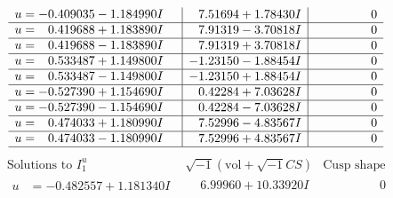 \documentclass[1p]{elsarticle_modified}
\theoremstyle{definition}
\newcommand{\I}{\sqrt{-1}}
\begin{document}
$$\begin{array}{c|c|c}
\begin{aligned}
u &= -0.409035 - 1.184990 I\end{aligned}
 & \phantom{-}7.51694 + 1.78430 I & \phantom{-0.000000 } 0 \\ \hline\begin{aligned}
u &= \phantom{-}0.419688 + 1.183890 I\end{aligned}
 & \phantom{-}7.91319 - 3.70818 I & \phantom{-0.000000 } 0 \\ \hline\begin{aligned}
u &= \phantom{-}0.419688 - 1.183890 I\end{aligned}
 & \phantom{-}7.91319 + 3.70818 I & \phantom{-0.000000 } 0 \\ \hline\begin{aligned}
u &= \phantom{-}0.533487 + 1.149800 I\end{aligned}
 & -1.23150 - 1.88454 I & \phantom{-0.000000 } 0 \\ \hline\begin{aligned}
u &= \phantom{-}0.533487 - 1.149800 I\end{aligned}
 & -1.23150 + 1.88454 I & \phantom{-0.000000 } 0 \\ \hline\begin{aligned}
u &= -0.527390 + 1.154690 I\end{aligned}
 & \phantom{-}0.42284 + 7.03628 I & \phantom{-0.000000 } 0 \\ \hline\begin{aligned}
u &= -0.527390 - 1.154690 I\end{aligned}
 & \phantom{-}0.42284 - 7.03628 I & \phantom{-0.000000 } 0 \\ \hline\begin{aligned}
u &= \phantom{-}0.474033 + 1.180990 I\end{aligned}
 & \phantom{-}7.52996 - 4.83567 I & \phantom{-0.000000 } 0 \\ \hline\begin{aligned}
u &= \phantom{-}0.474033 - 1.180990 I\end{aligned}
 & \phantom{-}7.52996 + 4.83567 I & \phantom{-0.000000 } 0\\
 \hline 
 \end{array}$$\newpage$$\begin{array}{c|c|c}  
\text{Solutions to }I^u_{1}& \I (\text{vol} + \sqrt{-1}CS) & \text{Cusp shape}\\
 \hline 
\begin{aligned}
u &= -0.482557 + 1.181340 I\end{aligned}
 & \phantom{-}6.99960 + 10.33920 I & \phantom{-0.000000 } 0 \\ \hline\begin{aligned}

\end{aligned}
\end{array}$$
\end{document}
